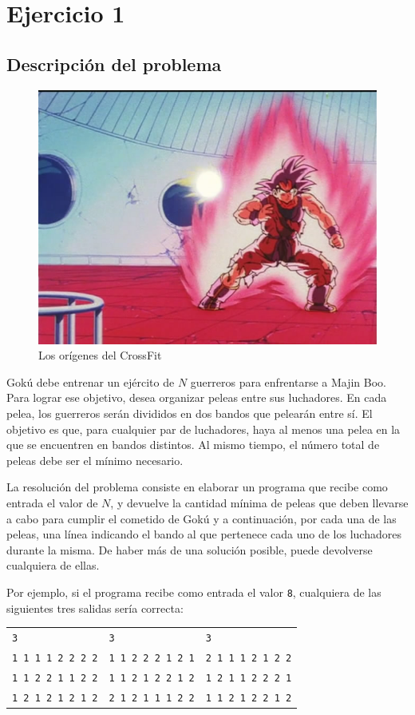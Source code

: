 \section{Ejercicio 1}
    \subsection{Descripción del problema}
		\begin{figure}[ht]
			\begin{center}
				\includegraphics[width=0.5\columnwidth]{imagenes/kaioken.jpg}
				\caption{Los orígenes del CrossFit}
			\end{center}
		\end{figure}
        Gokú debe entrenar un ejército de $N$ guerreros para enfrentarse a Majin Boo. Para lograr ese objetivo, desea organizar peleas entre sus luchadores. En cada pelea, los guerreros serán divididos en dos bandos que pelearán entre sí. El objetivo es que, para cualquier par de luchadores, haya al menos una pelea en la que se encuentren en bandos distintos. Al mismo tiempo, el número total de peleas debe ser el mínimo necesario.

        La resolución del problema consiste en elaborar un programa que recibe como entrada el valor de $N$, y devuelve la cantidad mínima de peleas que deben llevarse a cabo para cumplir el cometido de Gokú y a continuación, por cada una de las peleas, una línea indicando el bando al que pertenece cada uno de los luchadores durante la misma. De haber más de una solución posible, puede devolverse cualquiera de ellas.

        Por ejemplo, si el programa recibe como entrada el valor \texttt{8}, cualquiera de las siguientes tres salidas sería correcta:

        \begin{center}\begin{tabular}{l @{\hskip 2em} | @{\hskip 2em} l @{\hskip 2em} | @{\hskip 2em} l}
            \texttt{3}               & \texttt{3}  &              \texttt{3}               \\
            \texttt{1 1 1 1 2 2 2 2} & \texttt{1 1 2 2 2 1 2 1} & \texttt{2 1 1 1 2 1 2 2} \\
            \texttt{1 1 2 2 1 1 2 2} & \texttt{1 1 2 1 2 2 1 2} & \texttt{1 2 1 1 2 2 2 1} \\
            \texttt{1 2 1 2 1 2 1 2} & \texttt{2 1 2 1 1 1 2 2} & \texttt{1 1 2 1 2 2 1 2} \\
        \end{tabular}\end{center}

